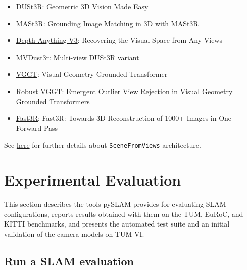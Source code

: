 \documentclass{article}
\providecommand{\tightlist}{%
  \setlength{\itemsep}{0pt}\setlength{\parskip}{0pt}}
\begin{document}
\begin{itemize}
\tightlist
\item
  \href{https://arxiv.org/abs/2312.14132}{DUSt3R}\cite{wang2023dust3r}: Geometric 3D Vision
  Made Easy
\item
  \href{https://arxiv.org/abs/2406.09756}{MASt3R}\cite{master}: Grounding Image
  Matching in 3D with MASt3R 
\item
  \href{https://arxiv.org/abs/2511.10647}{Depth Anything V3}\cite{depthanything3}: Recovering
  the Visual Space from Any Views
\item
  \href{https://github.com/naver/mvdust3r}{MVDust3r}\cite{mvduster}: Multi-view DUSt3R
  variant
\item
  \href{https://github.com/facebookresearch/vggt}{VGGT}\cite{wang2025vggt}: Visual Geometry
  Grounded Transformer
\item
  \href{https://github.com/cvlab-kaist/RobustVGGT.git}{Robust VGGT}\cite{vggt_robust}:
  Emergent Outlier View Rejection in Visual Geometry Grounded
  Transformers
\item
  \href{https://arxiv.org/abs/2501.13928}{Fast3R}\cite{yang2025fast3r}: Fast3R: Towards 3D Reconstruction of 1000+ Images in One Forward Pass
\end{itemize}

See \href{https://github.com/luigifreda/pyslam/blob/master/pyslam/scene_from_views/README.md}{here} for further details about
\texttt{SceneFromViews} architecture.


\hypertarget{evaluating-slam}{%
\section{Experimental Evaluation}\label{evaluating-slam}}

This section describes the tools pySLAM provides for evaluating SLAM configurations, reports results obtained with them on the TUM, EuRoC, and KITTI benchmarks, and presents the automated test suite and an initial validation of the camera models on TUM-VI.

\hypertarget{run-a-slam-evaluation}{%
\subsection{Run a SLAM evaluation}\label{run-a-slam-evaluation}}
\end{document}
